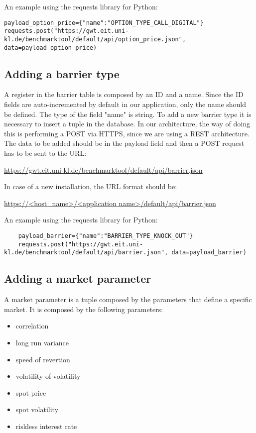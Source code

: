 \documentclass[11pt,a4paper]{article}
\begin{document}
An example using the requests library for Python:
\begin{lstlisting}
payload_option_price={"name":"OPTION_TYPE_CALL_DIGITAL"}
requests.post("https://gwt.eit.uni-kl.de/benchmarktool/default/api/option_price.json", data=payload_option_price)
\end{lstlisting}

\subsection{Adding a barrier type}
A register in the barrier table is composed by an ID and a name. 
Since the ID fields are auto-incremented by default in our application, only the name should be defined. 
The type of the field "name" is string.
To add a new barrier type it is necessary to insert a tuple in the database. 
In our architecture, the way of doing this is performing a POST via HTTPS, since we are using a REST architecture.
The data to be added should be in the payload field and then a POST request has to be sent to the URL: 

\noindent\url{https://gwt.eit.uni-kl.de/benchmarktool/default/api/barrier.json}

In case of a new installation, the URL format should be:

\noindent\url{https://<host_name>/<application name>/default/api/barrier.json}

An example using the requests library for Python:
\begin{lstlisting}
	payload_barrier={"name":"BARRIER_TYPE_KNOCK_OUT"}
	requests.post("https://gwt.eit.uni-kl.de/benchmarktool/default/api/barrier.json", data=payload_barrier)
\end{lstlisting}

\subsection{Adding a market parameter}
A market parameter is a tuple composed by the parameters that define a specific market.
It is composed by the following parameters:
\begin{itemize}
	\item correlation
	\item long run variance
	\item speed of revertion
	\item volatility of volatility
	\item spot price
	\item spot volatility
	\item riskless interest rate
\end{itemize}
\end{document}
